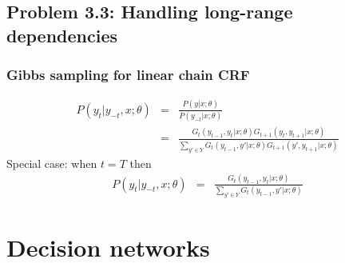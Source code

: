 \documentclass[11pt]{article}
\begin{document}
\begin{onehalfspace}
\subsection*{Problem 3.3: Handling long-range dependencies}
\subsubsection*{Gibbs sampling for linear chain CRF}
\begin{eqnarray*}
P(y_t|y_{-t},x;\theta) &=& \frac{P(y|x;\theta)}{P(y_{-t}|x;\theta)}\\
    &=& \frac{G_t(y_{t-1},y_t|x;\theta)G_{t+1}(y_t,y_{t+1}|x;\theta)}{\sum_{y'\in Y}G_t(y_{t-1},y'|x;\theta)G_{t+1}(y',y_{t+1}|x;\theta)}
\end{eqnarray*}
Special case: when $t=T$ then\\
\begin{eqnarray*}
P(y_t|y_{-t},x;\theta) &=& \frac{G_t(y_{t-1},y_t|x;\theta)}{\sum_{y'\in Y}G_t(y_{t-1},y'|x;\theta)}
\end{eqnarray*}

\section{Decision networks}
\end{onehalfspace}
\end{document}

